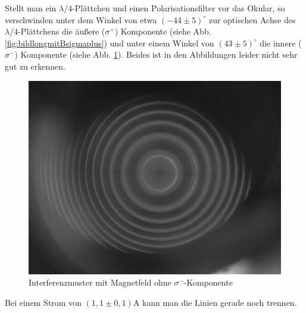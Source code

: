 Stellt man ein $\lambda/4$-Plättchen und einen Polarisationsfilter vor das Okular, so verschwinden unter dem Winkel von etwa $(-44 \pm 5)^\circ$ zur optischen Achse des $\lambda/4$-Plättchens die äußere ($\sigma^+$) Komponente (siehe Abb. \ref{fig:bildlongmitBsigmaplus}) und unter einem Winkel von $(43 \pm 5)^\circ$ die innere ($\sigma^-$) Komponente (siehe Abb. \ref{fig:bildlongmitBsigmaminus}). Beides ist in den Abbildungen leider nicht sehr gut zu erkennen.\\
\begin{figure}
\centering
\includegraphics[scale=0.1]{data/bilder_okular/bild_8_edit.jpg}
\caption{Interferenzmuster mit Magnetfeld ohne $\sigma^-$-Komponente}
\label{fig:bildlongmitBsigmaminus}
\end{figure}
Bei einem Strom von $\si{(1,1\pm 0,1)\ampere}$ kann man die Linien gerade noch trennen.